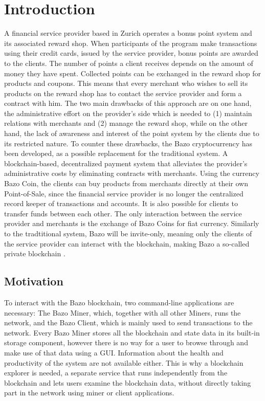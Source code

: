\chapter{Introduction}
A financial service provider based in Zurich operates a bonus point system and its associated reward shop. When participants of the program make transactions using their credit cards, issued by the service provider, bonus points are awarded to the clients. The number of points a client receives depends on the amount of money they have spent. Collected points can be exchanged in the reward shop for products and coupons. This means that every merchant who wishes to sell its products on the reward shop has to contact the service provider and form a contract with him. The two main drawbacks of this approach are on one hand, the administrative effort on the provider's side which is needed to (1) maintain relations with merchants and (2) manage the reward shop, while on the other hand, the lack of awareness and interest of the point system by the clients due to its restricted nature.
To counter these drawbacks, the Bazo cryptocurrency has been developed, as a possible replacement for the traditional system. A blockchain-based, decentralized payment system that alleviates the provider's administrative costs by eliminating contracts with merchants. Using the currency Bazo Coin, the clients can buy products from merchants directly at their own Point-of-Sale, since the financial service provider is no longer the centralized record keeper of transactions and accounts. It is also possible for clients to transfer funds between each other. The only interaction between the service provider and merchants is the exchange of Bazo Coins for fiat currency. Similarly to the tradtitional system, Bazo will be invite-only, meaning only the clients of the service provider can interact with the blockchain, making Bazo a so-called private blockchain \cite{bazo}.

\section{Motivation}
To interact with the Bazo blockchain, two command-line applications are necessary: The Bazo Miner, which, together with all other Miners, runs the network, and the Bazo Client, which is mainly used to send transactions to the network. Every Bazo Miner stores all the blockchain and state data in its built-in storage component, however there is no way for a user to browse through and make use of that data using a GUI. Information about the health and productivity of the system are not available either. This is why a blockchain explorer is needed, a separate service that runs independently from the blockchain and lets users examine the blockchain data, without directly taking part in the network using miner or client applications.


